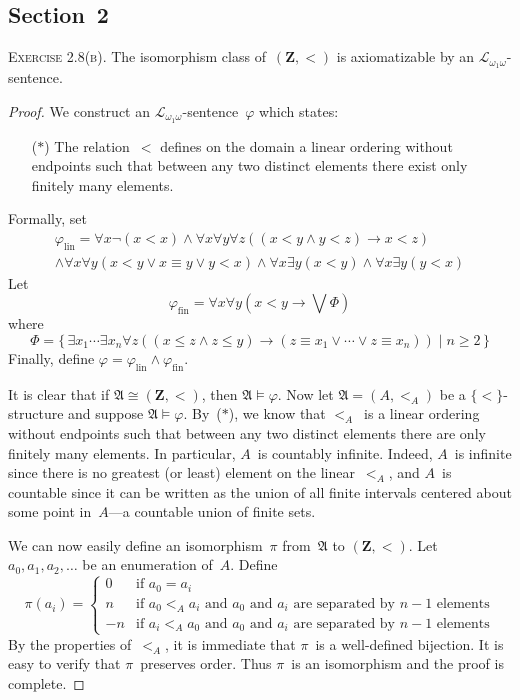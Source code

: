\documentclass[letterpaper]{article}
\newcommand{\Z}{\mathbf{Z}}
\newcommand{\lequ}{\equiv}
\newcommand{\limp}{\rightarrow}
\newcommand{\iso}{\cong}
\newcommand{\A}{\mathfrak{A}}
\renewcommand{\L}{\mathcal{L}}
\newcommand{\Lo}{\L_{\omega_1\omega}}
\newcommand{\biglor}{\textstyle{\bigvee}}
\theoremstyle{remark}
\begin{document}
\subsection*{Section~2}
\noindent\textsc{Exercise 2.8(b).} The isomorphism class of~$(\Z,<)$ is axiomatizable by an $\Lo$-sentence.
\begin{proof}
We construct an $\Lo$-sentence~$\varphi$ which states:
\begin{enumerate}
\item[($*$)] The relation~$<$ defines on the domain a linear ordering without endpoints such that between any two distinct elements there exist only finitely many elements.
\end{enumerate}
Formally, set
\begin{multline*}
\varphi_{\mathrm{lin}}=\forall x\lnot(x<x)\land\forall x\forall y\forall z((x<y\land y<z)\limp x<z)\\
    \land\forall x\forall y(x<y\lor x\lequ y\lor y<x)\land\forall x\exists y(x<y)\land\forall x\exists y(y<x)
\end{multline*}
Let
$$\varphi_{\mathrm{fin}}=\forall x\forall y(x<y\limp\biglor\Phi)$$
where
$$\Phi=\{\,\exists x_1\cdots\exists x_n\forall z((x\le z\land z\le y)\limp(z\lequ x_1\lor\cdots\lor z\lequ x_n))\mid n\ge2\,\}$$
Finally, define $\varphi=\varphi_{\mathrm{lin}}\land\varphi_{\mathrm{fin}}$.

It is clear that if $\A\iso(\Z,<)$, then $\A\models\varphi$. Now let $\A=(A,<_A)$ be a $\{<\}$-structure and suppose $\A\models\varphi$. By~($*$), we know that $<_A$~is a linear ordering without endpoints such that between any two distinct elements there are only finitely many elements. In particular, $A$~is countably infinite. Indeed, $A$~is infinite since there is no greatest (or least) element on the linear~$<_A$, and $A$~is countable since it can be written as the union of all finite intervals centered about some point in~$A$---a countable union of finite sets.

We can now easily define an isomorphism~$\pi$ from~$\A$ to $(\Z,<)$. Let $a_0,a_1,a_2,\ldots$ be an enumeration of~$A$. Define
$$\pi(a_i)=
\begin{cases}
0&\text{if $a_0=a_i$}\\
n&\text{if $a_0<_A a_i$ and $a_0$~and~$a_i$ are separated by $n-1$~elements}\\
-n&\text{if $a_i<_A a_0$ and $a_0$~and~$a_i$ are separated by $n-1$~elements}
\end{cases}$$
By the properties of~$<_A$, it is immediate that $\pi$~is a well-defined bijection. It is easy to verify that $\pi$~preserves order. Thus $\pi$~is an isomorphism and the proof is complete.
\end{proof}
\end{document}

